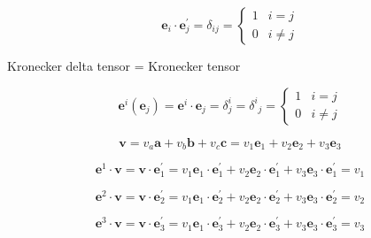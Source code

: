 \documentclass[
]{book}
\theoremstyle{definition}
\theoremstyle{definition}
\theoremstyle{definition}
\theoremstyle{definition}
\theoremstyle{remark}
\begin{document}
\[
\boldsymbol{e}_{{\scriptscriptstyle i}}\cdot\boldsymbol{e}_{{\scriptscriptstyle j}}^{\prime}=\delta_{{\scriptscriptstyle ij}}=\begin{cases}
1 & i=j\\
0 & i\ne j
\end{cases}
\]

Kronecker delta tensor = Kronecker tensor

\[
\boldsymbol{e}^{{\scriptscriptstyle i}}\left(\boldsymbol{e}_{{\scriptscriptstyle j}}\right)=\boldsymbol{e}^{{\scriptscriptstyle i}}\cdot\boldsymbol{e}_{{\scriptscriptstyle j}}=\delta_{{\scriptscriptstyle j}}^{{\scriptscriptstyle i}}=\delta^{{\scriptscriptstyle i}}{}_{{\scriptscriptstyle j}}=\begin{cases}
1 & i=j\\
0 & i\ne j
\end{cases}
\]

\[
\boldsymbol{v}=v_{{\scriptscriptstyle a}}\boldsymbol{a}+v_{{\scriptscriptstyle b}}\boldsymbol{b}+v_{{\scriptscriptstyle c}}\boldsymbol{c}=v_{{\scriptscriptstyle 1}}\boldsymbol{e}_{{\scriptscriptstyle 1}}+v_{{\scriptscriptstyle 2}}\boldsymbol{e}_{{\scriptscriptstyle 2}}+v_{{\scriptscriptstyle 3}}\boldsymbol{e}_{{\scriptscriptstyle 3}}
\]

\[
\boldsymbol{e}^{{\scriptscriptstyle 1}}\cdot\boldsymbol{v}=\boldsymbol{v}\cdot\boldsymbol{e}_{{\scriptscriptstyle 1}}^{\prime}=v_{{\scriptscriptstyle 1}}\boldsymbol{e}_{{\scriptscriptstyle 1}}\cdot\boldsymbol{e}_{{\scriptscriptstyle 1}}^{\prime}+v_{{\scriptscriptstyle 2}}\boldsymbol{e}_{{\scriptscriptstyle 2}}\cdot\boldsymbol{e}_{{\scriptscriptstyle 1}}^{\prime}+v_{{\scriptscriptstyle 3}}\boldsymbol{e}_{{\scriptscriptstyle 3}}\cdot\boldsymbol{e}_{{\scriptscriptstyle 1}}^{\prime}=v_{{\scriptscriptstyle 1}}
\]

\[
\boldsymbol{e}^{{\scriptscriptstyle 2}}\cdot\boldsymbol{v}=\boldsymbol{v}\cdot\boldsymbol{e}_{{\scriptscriptstyle 2}}^{\prime}=v_{{\scriptscriptstyle 1}}\boldsymbol{e}_{{\scriptscriptstyle 1}}\cdot\boldsymbol{e}_{{\scriptscriptstyle 2}}^{\prime}+v_{{\scriptscriptstyle 2}}\boldsymbol{e}_{{\scriptscriptstyle 2}}\cdot\boldsymbol{e}_{{\scriptscriptstyle 2}}^{\prime}+v_{{\scriptscriptstyle 3}}\boldsymbol{e}_{{\scriptscriptstyle 3}}\cdot\boldsymbol{e}_{{\scriptscriptstyle 2}}^{\prime}=v_{{\scriptscriptstyle 2}}
\]

\[
\boldsymbol{e}^{{\scriptscriptstyle 3}}\cdot\boldsymbol{v}=\boldsymbol{v}\cdot\boldsymbol{e}_{{\scriptscriptstyle 3}}^{\prime}=v_{{\scriptscriptstyle 1}}\boldsymbol{e}_{{\scriptscriptstyle 1}}\cdot\boldsymbol{e}_{{\scriptscriptstyle 3}}^{\prime}+v_{{\scriptscriptstyle 2}}\boldsymbol{e}_{{\scriptscriptstyle 2}}\cdot\boldsymbol{e}_{{\scriptscriptstyle 3}}^{\prime}+v_{{\scriptscriptstyle 3}}\boldsymbol{e}_{{\scriptscriptstyle 3}}\cdot\boldsymbol{e}_{{\scriptscriptstyle 3}}^{\prime}=v_{{\scriptscriptstyle 3}}
\]
\end{document}
